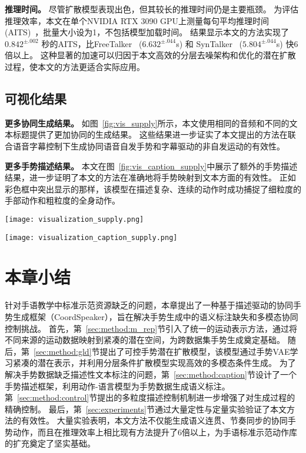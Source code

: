 \textbf{推理时间。}
尽管扩散模型表现出色，但其较长的推理时间仍是主要瓶颈。
为评估推理效率，本文在单个NVIDIA RTX 3090 GPU上测量每句平均推理时间(AITS)~\cite{chen2023executing}，批量大小设为1，不包括模型加载时间。
结果显示本文的方法实现了 $0.842^{\pm .002}$ 秒的AITS，比FreeTalker~\cite{yang2024freetalker} ($6.632^{\pm .044}$s) 和 SynTalker~\cite{chen2024syntalker} ($5.804^{\pm .044}$s) 快6倍以上。
这种显著的加速可以归因于本文高效的分层去噪架构和优化的潜在扩散过程，使本文的方法更适合实际应用。

\subsection{可视化结果}
\textbf{更多协同生成结果。}
如图~\ref{fig:vis_supply}所示，本文使用相同的音频和不同的文本标题提供了更加协同的生成结果。
这些结果进一步证实了本文提出的方法在联合语音字幕控制下生成协同语音自发手势和字幕驱动的非自发运动的有效性。

\textbf{更多手势描述结果。}
本文在图~\ref{fig:vis_caption_supply}中展示了额外的手势描述结果，进一步证明了本文的方法在准确地将手势映射到文本方面的有效性。
正如彩色框中突出显示的那样，该模型在描述复杂、连续的动作时成功捕捉了细粒度的手部动作和粗粒度的全身动作。

\begin{figure*}[t]
  \centering
  \texttt{[image: visualization\_supply.png]}
  \caption{协同手势生成的更多视觉结果。}
  \label{fig:vis_supply}
\end{figure*}

\begin{figure*}[t]
  \centering
  \texttt{[image: visualization\_caption\_supply.png]}
  \caption{更多手势描述结果。彩色框突出显示了手势和文本字幕之间的精确映射。}
  \label{fig:vis_caption_supply}
\end{figure*}


\section{本章小结}
针对手语教学中标准示范资源缺乏的问题，本章提出了一种基于描述驱动的协同手势生成框架（CoordSpeaker），旨在解决手势生成中的语义标注缺失和多模态协同控制挑战。
首先，第~\ref{sec:method:m_rep}节引入了统一的运动表示方法，通过将不同来源的运动数据映射到紧凑的潜在空间，为跨数据集手势生成奠定基础。
随后，第~\ref{sec:method:gld}节提出了可控手势潜在扩散模型，该模型通过手势VAE学习紧凑的潜在表示，并利用分层条件扩散模型实现高效的多模态条件生成。
为了解决手势数据缺乏描述性文本标注的问题，第~\ref{sec:method:caption}节设计了一个手势描述框架，利用动作-语言模型为手势数据生成语义标注。
第~\ref{sec:method:control}节提出的多粒度描述控制机制进一步增强了对生成过程的精确控制。
最后，第~\ref{sec:experiments}节通过大量定性与定量实验验证了本文方法的有效性。
大量实验表明，本文方法不仅能生成语义连贯、节奏同步的协同手势动作，而且在推理效率上相比现有方法提升了6倍以上，为手语标准示范动作库的扩充奠定了坚实基础。
